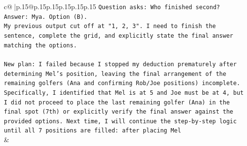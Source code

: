 \documentclass{article}
\begin{document}
{\begin{supertabular}{c@{$\;$}|p{.15\linewidth}@{}p{.15\linewidth}p{.15\linewidth}p{.15\linewidth}p{.15\linewidth}p{.15\linewidth}}
{{{\texttt{Question asks: Who finished second?} \\
\texttt{Answer: Mya. Option (B).} \\
\texttt{My previous output cut off at "1, 2, 3". I need to finish the sentence, complete the grid, and explicitly state the final answer matching the options.} \\
\\ 
\texttt{New plan: I failed because I stopped my deduction prematurely after determining Mel's position, leaving the final arrangement of the remaining golfers (Ana and confirming Rob/Joe positions) incomplete. Specifically, I identified that Mel is at 5 and Joe must be at 4, but I did not proceed to place the last remaining golfer (Ana) in the final spot (7th) or explicitly verify the final answer against the provided options. Next time, I will continue the step{-}by{-}step logic until all 7 positions are filled: after placing Mel} \\
            }
        }
    }
    & \\ \\

\end{supertabular}
}
\end{document}
